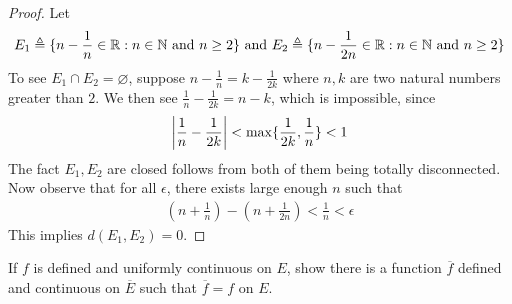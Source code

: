\documentclass{report}
\begin{document}
\begin{proof}
Let 
\begin{align*}
E_1\triangleq  \{ n-\frac{1}{n}\in\mathbb{R}: n\in\mathbb{N} \text{ and }n\geq 2  \}\text{ and }E_2\triangleq \{ n-\frac{1}{2n}\in\mathbb{R}: n\in\mathbb{N}\text{ and }n\geq 2 \}
\end{align*}
To see $E_1\cap E_2=\varnothing$, suppose $n-\frac{1}{n}=k-\frac{1}{2k}$ where $n,k$ are two natural numbers greater than $2$. We then see $\frac{1}{n}- \frac{1}{2k}=n-k$, which is impossible, since 
\begin{align*}
\left|\frac{1}{n}-\frac{1}{2k}\right|< \max \{ \frac{1}{2k},\frac{1}{n} \}<1
\end{align*}
The fact $E_1,E_2$ are closed follows from both of them being totally disconnected. Now observe that for all $\epsilon $, there exists large enough $n$ such that 
\begin{align*}
  (n+\frac{1}{n})-(n+\frac{1}{2n})<\frac{1}{n}< \epsilon 
\end{align*}
This implies $d(E_1,E_2)=0$.
\end{proof}
\begin{question}{}{}
If $f$ is defined and uniformly continuous on $E$, show there is a function  $\overline{f}$ defined and continuous on $\overline{E}$ such that $\overline{f}=f$ on $E$.
\end{question}
\end{document}
